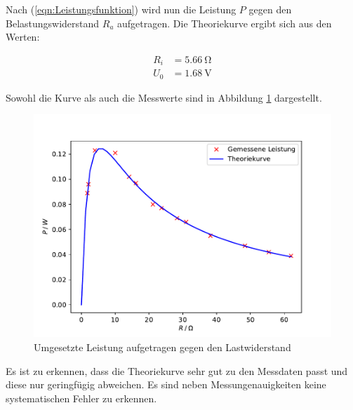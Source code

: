 Nach (\ref{eqn:Leistungsfunktion}) wird nun die Leistung $P$ gegen den
Belastungswiderstand $R_a$ aufgetragen. Die Theoriekurve ergibt sich aus 
den Werten:

\begin{align*}
R_i &= \SI{5.66}{\ohm}\\
U_0 &= \SI{1.68}{\volt}
\end{align*}

Sowohl die Kurve als auch die Messwerte sind in Abbildung \ref{fig:plot5}
dargestellt. 

\begin{figure}
  \centering
  \includegraphics[scale=0.75]{content/plot5.pdf}
  \caption{Umgesetzte Leistung aufgetragen gegen den Lastwiderstand}
  \label{fig:plot5}
\end{figure}

Es ist zu erkennen, dass die Theoriekurve sehr gut zu den Messdaten passt 
und diese nur geringfügig abweichen. Es sind neben Messungenauigkeiten
keine systematischen Fehler zu erkennen. 